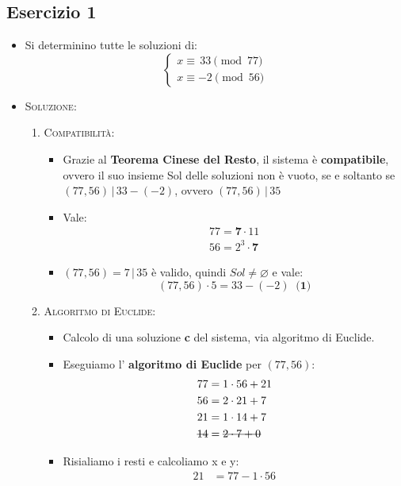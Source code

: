 \documentclass[10pt]{article}
\begin{document}
	\subsection{Esercizio 1}
	\begin{itemize}
	\item
	Si determinino tutte le soluzioni di:
	\[		
	\begin{cases}
	x \equiv \, 33 \pmod{77} \\
	x \equiv -2 \pmod{56}
	\end{cases}
	\]
	\item
	\textsc{Soluzione:}
	\begin{enumerate}
	\item
	\textsc{Compatibilità}:
	\begin{itemize}
	\item
	Grazie al \textbf{Teorema Cinese del Resto}, il sistema è \textbf{compatibile}, ovvero il suo insieme \textsf{Sol} delle soluzioni non è vuoto, se e soltanto se $(77, 56) \,|\, 33 - (-2)$, ovvero $(77,56) \,|\, 35$
	\item
	Vale:
	\[		
	\begin{split}
	77 = \textbf{7} \cdot 11 \\
	56 = 2^3 \cdot \textbf{7}
	\end{split}
	\]
	\item
	$(77,56) = 7 \,|\, 35$ è valido, quindi $Sol \neq \varnothing $ e vale: $$(77,56) \cdot 5 = 33 - (-2) \;\; \textbf{(1)}$$
	\end{itemize}
	\item
	\textsc{Algoritmo di Euclide}:
	\begin{itemize}
	\item
	Calcolo di una soluzione \textbf{c} del sistema, via algoritmo di Euclide.
	\item
	Eseguiamo l' \textbf{algoritmo di Euclide} per $(77,56)$:
	\begin{equation}
	\begin{split}
	77 &= 1 \cdot 56 + 21 \\
	56 &= 2 \cdot 21 + 7 \\
	21 &= 1 \cdot 14 + 7 \\
	\hbox{\sout{$14$}} &= \hbox{\sout{$2 \cdot 7 + 0$}}
	\notag
	\end{split}
	\end{equation}
	\item
	Risialiamo i resti e calcoliamo x e y:
	\begin{equation}
	\begin{split}
	21 &= 77 - 1 \cdot 56 \\

\end{split}
\end{equation}
\end{itemize}
\end{enumerate}
\end{itemize}
\end{document}
